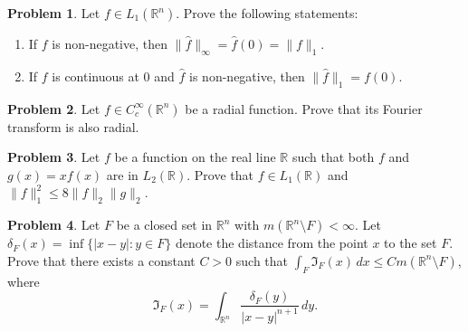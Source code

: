 \documentclass[12pt,reqno]{amsart}
\def\field#1{\mathbb{#1}}
\def\abs#1{\lvert {#1} \rvert}
\def\Lpnorm#1#2{\lVert {#1} \rVert_{#2}}
\theoremstyle{definition}
\newtheorem{problem}{Problem}
\theoremstyle{remark}
\begin{document}
\begin{problem}
  Let $f \in L_1(\field{R}^n)$. Prove the following statements:
  \begin{enumerate}
  \item If $f$ is non-negative, then $\Lpnorm{\widehat{f}}{\infty} =
    \widehat{f}(0) = \Lpnorm{f}{1}$.
  \item If $f$ is continuous at $0$ and $\widehat{f}$ is non-negative,
    then $\Lpnorm{\widehat{f}}{1} = f(0)$.
  \end{enumerate}
\end{problem}
\begin{problem}
  Let $f \in C_c^\infty(\field{R}^n)$ be a radial function.  Prove
  that its Fourier transform is also radial.
\end{problem}
\begin{problem}
  Let $f$ be a function on the real line $\field{R}$ such that both
  $f$ and $g(x)=xf(x)$ are in $L_2(\field{R})$.  Prove that $f \in
  L_1(\field{R})$ and $\Lpnorm{f}{1}^2 \leq 8 \Lpnorm{f}{2}
  \Lpnorm{g}{2}$.
\end{problem}
\begin{problem}
  Let $F$ be a closed set in $\field{R}^n$ with $m(\field{R}^n
  \setminus F) < \infty$.  Let $\delta_F(x) = \inf \{ \abs{x - y} : y
  \in F\}$ denote the distance from the point $x$ to the set $F$.
  Prove that there exists a constant $C>0$ such that $\int_F
  \mathfrak{I}_F(x)\, dx \leq C m(\field{R}^n \setminus F)$, where
  \begin{equation*}
    \mathfrak{I}_F (x) = \int_{\field{R}^n}
    \frac{\delta_F(y)}{\abs{x-y}^{n+1}}\, dy.
  \end{equation*}
\end{problem}
\end{document}
